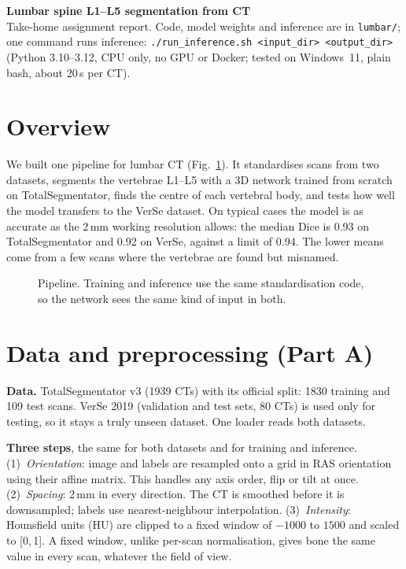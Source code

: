 \documentclass[10pt,a4paper]{article}
\begin{document}
\small

{\sffamily\bfseries\Large Lumbar spine L1--L5 segmentation from CT}\\[2pt]
{\footnotesize Take-home assignment report. Code, model weights and inference are in \texttt{lumbar/}; one command runs inference:
\texttt{./run\_inference.sh <input\_dir> <output\_dir>} (Python 3.10--3.12, CPU only, no GPU or Docker; tested on Windows~11, plain bash, about 20\,s per CT).}

\section{Overview}
We built one pipeline for lumbar CT (Fig.~\ref{fig:pipeline}). It standardises scans from two datasets, segments the vertebrae L1--L5 with a 3D network trained from scratch on TotalSegmentator, finds the centre of each vertebral body, and tests how well the model transfers to the VerSe dataset.
On typical cases the model is as accurate as the 2\,mm working resolution allows: the median Dice is 0.93 on TotalSegmentator and 0.92 on VerSe, against a limit of 0.94. The lower means come from a few scans where the vertebrae are found but misnamed.

\begin{figure}[h]
\centering
\resizebox{0.74\linewidth}{!}{}
\caption{Pipeline. Training and inference use the same standardisation code, so the network sees the same kind of input in both.}
\label{fig:pipeline}
\end{figure}

\section{Data and preprocessing (Part A)}
\textbf{Data.} TotalSegmentator v3 (1939 CTs) with its official split: 1830 training and 109 test scans. VerSe 2019 (validation and test sets, 80 CTs) is used only for testing, so it stays a truly unseen dataset. One loader reads both datasets.

\textbf{Three steps}, the same for both datasets and for training and inference.
(1)~\emph{Orientation}: image and labels are resampled onto a grid in RAS orientation using their affine matrix. This handles any axis order, flip or tilt at once.
(2)~\emph{Spacing}: 2\,mm in every direction. The CT is smoothed before it is downsampled; labels use nearest-neighbour interpolation.
(3)~\emph{Intensity}: Hounsfield units (HU) are clipped to a fixed window of $-1000$ to $1500$ and scaled to [0,\,1]. A fixed window, unlike per-scan normalisation, gives bone the same value in every scan, whatever the field of view.
\end{document}
